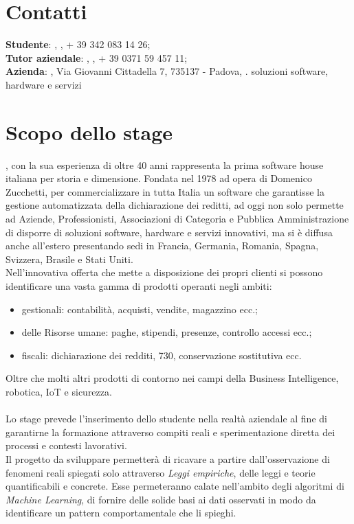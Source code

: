 \section{Contatti}
\textbf{Studente}: \myName, , + 39 342 083 14 26;\\
\textbf{Tutor aziendale}: \Greg, , + 39 0371 59 457 11;\\
\textbf{Azienda}: \myCompany, Via Giovanni Cittadella 7, 735137 - Padova, \sitoCompany.
soluzioni software, hardware e servizi 

\section{Scopo dello stage}
\textit{\myCompany}, con la sua esperienza di oltre 40 anni rappresenta la prima software house italiana per storia e dimensione. Fondata nel 1978 ad opera di Domenico Zucchetti, per commercializzare in tutta Italia un software che garantisse la gestione automatizzata della dichiarazione dei reditti, ad oggi non solo permette ad Aziende, Professionisti, Associazioni di Categoria e Pubblica Amministrazione di disporre di  soluzioni software, hardware e servizi innovativi, ma si è diffusa anche all'estero presentando sedi in Francia, Germania, Romania, Spagna, Svizzera, Brasile e Stati Uniti.\\ Nell'innovativa offerta che \textit{\myCompany{}} mette a disposizione dei propri clienti si possono identificare una vasta gamma di prodotti operanti negli ambiti:
\begin{itemize}
\item gestionali: contabilità, acquisti, vendite, magazzino ecc.;
\item delle Risorse umane: paghe, stipendi, presenze, controllo accessi ecc.;
\item fiscali: dichiarazione dei redditi, 730, conservazione sostitutiva ecc.
\end{itemize}
Oltre che molti altri prodotti di contorno nei campi della Business Intelligence, robotica, IoT e  sicurezza.
\\\\
Lo stage prevede l'inserimento dello studente nella realtà aziendale al fine di garantirne la formazione attraverso compiti reali e sperimentazione diretta dei processi e contesti lavorativi. \\
Il progetto da sviluppare permetterà di ricavare a partire dall'osservazione di fenomeni reali spiegati solo attraverso \textit{Leggi empiriche}, delle leggi e teorie quantificabili e concrete. Esse permeteranno calate nell'ambito degli algoritmi di \textit{Machine Learning}, di fornire delle solide basi ai dati osservati in modo da identificare un pattern comportamentale che li spieghi.
